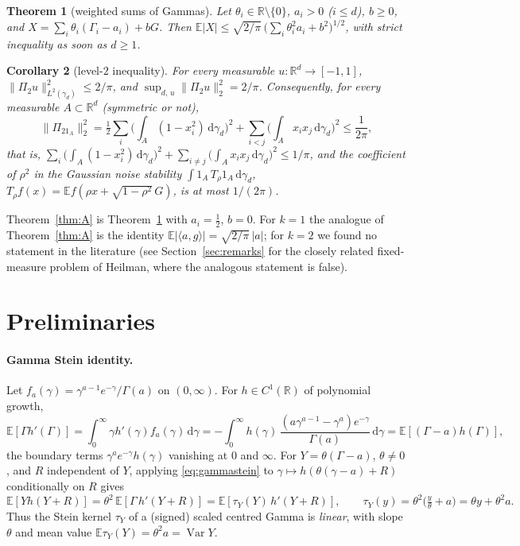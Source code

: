 \documentclass[11pt]{article}
\newtheorem{theorem}{Theorem}[section]
\newtheorem{corollary}[theorem]{Corollary}
\theoremstyle{remark}
\newcommand{\E}{\mathbb{E}}
\newcommand{\R}{\mathbb{R}}
\newcommand{\Var}{\operatorname{Var}}
\newcommand{\dd}{\,\mathrm{d}}
\begin{document}
\begin{theorem}[weighted sums of Gammas]\label{thm:B}
Let $\theta_i\in\R\setminus\{0\}$, $a_i>0$ ($i\le d$), $b\ge0$, and $X=\sum_i\theta_i(\Gamma_i-a_i)+bG$. Then
$\E|X|\le\sqrt{2/\pi}\,\big(\sum_i\theta_i^2a_i+b^2\big)^{1/2}$, with strict inequality as soon as $d\ge1$.
\end{theorem}

\begin{corollary}[level-$2$ inequality]\label{cor:dual}
For every measurable $u:\R^d\to[-1,1]$, $\|\Pi_2u\|_{L^2(\gamma_d)}^2\le 2/\pi$, and $\sup_{d,\,u}\|\Pi_2u\|_2^2=2/\pi$.
Consequently, for every measurable $A\subset\R^d$ (symmetric or not),
\[
\|\Pi_21_A\|_2^2=\tfrac12\sum_{i}\Big(\int_A(1-x_i^2)\dd\gamma_d\Big)^2+\sum_{i<j}\Big(\int_Ax_ix_j\dd\gamma_d\Big)^2\le\frac1{2\pi},
\]
that is, $\sum_{i}\big(\int_A(1-x_i^2)\dd\gamma_d\big)^2+\sum_{i\ne j}\big(\int_Ax_ix_j\dd\gamma_d\big)^2\le1/\pi$,
and the coefficient of $\rho^2$ in the Gaussian noise stability $\int1_A\,T_\rho1_A\dd\gamma_d$, $T_\rho f(x)=\E f(\rho x+\sqrt{1-\rho^2}\,G)$, is at most $1/(2\pi)$.
\end{corollary}

Theorem~\ref{thm:A} is Theorem~\ref{thm:B} with $a_i=\tfrac12$, $b=0$. For $k=1$ the analogue of Theorem~\ref{thm:A} is the identity
$\E|\langle a,g\rangle|=\sqrt{2/\pi}\,|a|$; for $k=2$ we found no statement in the literature (see Section~\ref{sec:remarks} for the
closely related fixed-measure problem of Heilman, where the analogous statement is false).

\section{Preliminaries}\label{sec:prelim}

\paragraph{Gamma Stein identity.}
Let $f_a(\gamma)=\gamma^{a-1}e^{-\gamma}/\Gamma(a)$ on $(0,\infty)$. For $h\in C^1(\R)$ of polynomial growth,
\begin{equation}\label{eq:gammastein}
\E[\Gamma h'(\Gamma)]=\int_0^\infty\gamma h'(\gamma)f_a(\gamma)\dd\gamma
=-\int_0^\infty h(\gamma)\,\frac{(a\gamma^{a-1}-\gamma^{a})e^{-\gamma}}{\Gamma(a)}\dd\gamma=\E[(\Gamma-a)h(\Gamma)],
\end{equation}
the boundary terms $\gamma^a e^{-\gamma}h(\gamma)$ vanishing at $0$ and $\infty$. For $Y=\theta(\Gamma-a)$, $\theta\ne0$, and $R$
independent of $Y$, applying \eqref{eq:gammastein} to $\gamma\mapsto h(\theta(\gamma-a)+R)$ conditionally on $R$ gives
\begin{equation}\label{eq:Ystein}
\E[Y h(Y+R)]=\theta^2\,\E[\Gamma\,h'(Y+R)]=\E[\tau_Y(Y)\,h'(Y+R)],\qquad \tau_Y(y)=\theta^2\big(\tfrac y\theta+a\big)=\theta y+\theta^2 a .
\end{equation}
Thus the Stein kernel $\tau_Y$ of a (signed) scaled centred Gamma is \emph{linear}, with slope $\theta$ and mean value $\E\tau_Y(Y)=\theta^2a=\Var Y$.
\end{document}
